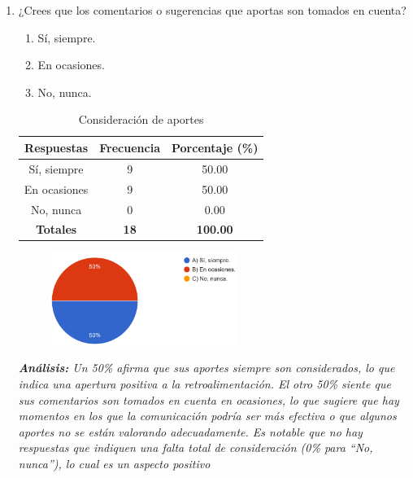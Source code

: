 \documentclass[journal]{IEEEtran}
\begin{document}
\begin{enumerate}
	\item ¿Crees que los comentarios o sugerencias que aportas son tomados en cuenta?
	\begin{enumerate}
		\item Sí, siempre.
		\item En ocasiones.
		\item No, nunca.
	\end{enumerate}
	\begin{table}[H]
		\renewcommand{\arraystretch}{1.3}
		\centering
		\caption{Consideración de aportes}
		\begin{tabular}{c c c}
			\hline
			\textbf{Respuestas} & \textbf{Frecuencia} & \textbf{Porcentaje (\%)}\\
			\hline
			Sí, siempre & 9 & 50.00\\
			En ocasiones & 9 & 50.00\\
			No, nunca & 0 & 0.00\\
			\hline
			\textbf{Totales} &\textbf{18}& \textbf{100.00}\\
			\hline
		\end{tabular}
	\end{table}
	\begin{figure}[h]
		\centering
		\includegraphics[width=06cm]{Pregunta15}
	\end{figure}
	\textit{\textbf{Análisis:} Un 50\% afirma que sus aportes siempre son considerados, lo que indica una apertura positiva a la retroalimentación. El otro 50\% siente que sus comentarios son tomados en cuenta en ocasiones, lo que sugiere que hay momentos en los que la comunicación podría ser más efectiva o que algunos aportes no se están valorando adecuadamente. Es notable que no hay respuestas que indiquen una falta total de consideración (0\% para “No, nunca”), lo cual es un aspecto positivo}\\


\end{enumerate}
\end{document}

